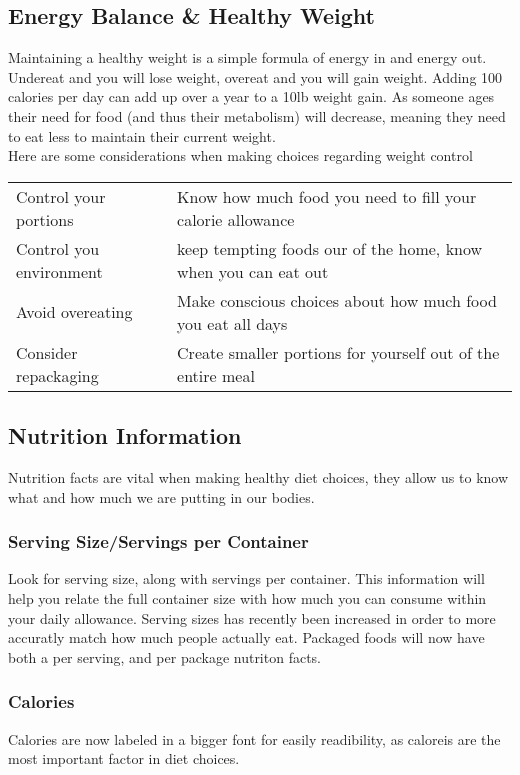 \documentclass[letterpaper, 11pt]{article}
\begin{document}
\subsection{Energy Balance \& Healthy Weight}
\label{sec:org2a99547}
Maintaining a healthy weight is a simple formula of energy in and energy out. Undereat and you will lose weight, overeat and you will gain weight. Adding 100 calories per day can add up over a year to a 10lb weight gain. As someone ages their need for food (and thus their metabolism) will decrease, meaning they need to eat less to maintain their current weight.\\
Here are some considerations when making choices regarding weight control\\
\begin{center}
\begin{tabular}{ll}
Control your portions & Know how much food you need to fill your calorie allowance\\
Control you environment & keep tempting foods our of the home, know when you can eat out\\
Avoid overeating & Make conscious choices about how much food you eat all days\\
Consider repackaging & Create smaller portions for yourself out of the entire meal\\
\end{tabular}
\end{center}
\subsection{Nutrition Information}
\label{sec:orgcfe5fd5}
Nutrition facts are vital when making healthy diet choices, they allow us to know what and how much we are putting in our bodies.\\
\subsubsection{Serving Size/Servings per Container}
\label{sec:org5ca1930}
Look for serving size, along with servings per container. This information will help you relate the full container size with how much you can consume within your daily allowance. Serving sizes has recently been increased in order to more accuratly match how much people actually eat. Packaged foods will now have both a per serving, and per package nutriton facts.\\
\subsubsection{Calories}
\label{sec:org1d9bda7}
Calories are now labeled in a bigger font for easily readibility, as caloreis are the most important factor in diet choices.\\
\end{document}
